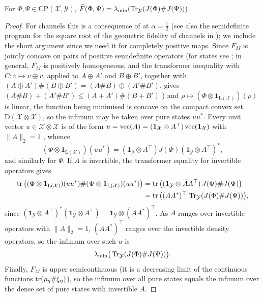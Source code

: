 \begin{proposition}\label{cont:lambda min formula}
   For $\Phi,\Psi\in \mathrm{CP}(\mathcal{X},\mathcal{Y})$, $\widehat{F}(\Phi,\Psi)=\lambda_{\min}(\operatorname{Tr}_{\mathcal{Y}}(J(\Phi)\#J(\Psi)))$.
\end{proposition}
\begin{proof}
    For channels this is a consequence of \cite[Proposition~44]{KatariyaWilde2021} at $\alpha=\tfrac12$ (see also the semidefinite program for the square root of the geometric fidelity of channels in \cite[eq.~(20)]{NuradhaWilde2025}); we include the short argument since we need it for completely positive maps. Since $F_M$ is jointly concave on pairs of positive semidefinite operators (for states see \cite{cree2020fidelity}; in general, $F_M$ is positively homogeneous, and the transformer inequality with $C\colon v\mapsto v\oplus v$, applied to $A\oplus A'$ and $B\oplus B'$, together with $(A\oplus A')\#(B\oplus B')=(A\#B)\oplus(A'\#B')$, gives $(A\#B)+(A'\#B')\leq(A+A')\#(B+B')$ \cite{KuboAndo1980}) and $\rho\mapsto(\Phi\otimes\mathbf{1}_{\mathrm{L}(\mathcal{X})})(\rho)$ is linear, the function being minimised is concave on the compact convex set $\mathrm{D}(\mathcal{X}\otimes\mathcal{X})$, so the infimum may be taken over pure states $uu^*$. Every unit vector $u\in\mathcal{X}\otimes\mathcal{X}$ is of the form $u=\operatorname{vec}(A)=(\mathbf{1}_{\mathcal{X}}\otimes A^\top)\operatorname{vec}(\mathbf{1}_{\mathcal{X}})$ with $\|A\|_2=1$ \cite[Section~1.1.2]{watrous2018theory}, whence
    \begin{equation}\label{cont:eq:vec identity}(\Phi\otimes\mathbf{1}_{\mathrm{L}(\mathcal{X})})(uu^*)=(\mathbf{1}_{\mathcal{Y}}\otimes A^\top)J(\Phi)(\mathbf{1}_{\mathcal{Y}}\otimes A^\top)^*,\end{equation}
    and similarly for $\Psi$. If $A$ is invertible, the transformer equality for invertible operators \cite{KuboAndo1980} gives
    \begin{align*}
    \operatorname{tr}\big((\Phi\otimes\mathbf{1}_{\mathrm{L}(\mathcal{X})})(uu^*)\#(\Psi\otimes\mathbf{1}_{\mathrm{L}(\mathcal{X})})(uu^*)\big)&=\operatorname{tr}\big((\mathbf{1}_{\mathcal{Y}}\otimes \overline{A}A^\top)\,J(\Phi)\#J(\Psi)\big)\\
    &=\operatorname{tr}\big((AA^*)^\top\,\operatorname{Tr}_{\mathcal{Y}}(J(\Phi)\#J(\Psi))\big),
    \end{align*}
    since $(\mathbf{1}_{\mathcal{Y}}\otimes A^\top)^*(\mathbf{1}_{\mathcal{Y}}\otimes A^\top)=\mathbf{1}_{\mathcal{Y}}\otimes(AA^*)^\top$. As $A$ ranges over invertible operators with $\|A\|_2=1$, $(AA^*)^\top$ ranges over the invertible density operators, so the infimum over such $u$ is
    \[\lambda_{\min}\big(\operatorname{Tr}_{\mathcal{Y}}(J(\Phi)\#J(\Psi))\big).\]
    Finally, $F_M$ is upper semicontinuous (it is a decreasing limit of the continuous functions $\operatorname{tr}(\rho_\eta\#\xi_\eta)$), so the infimum over all pure states equals the infimum over the dense set of pure states with invertible $A$.
\end{proof}
 
